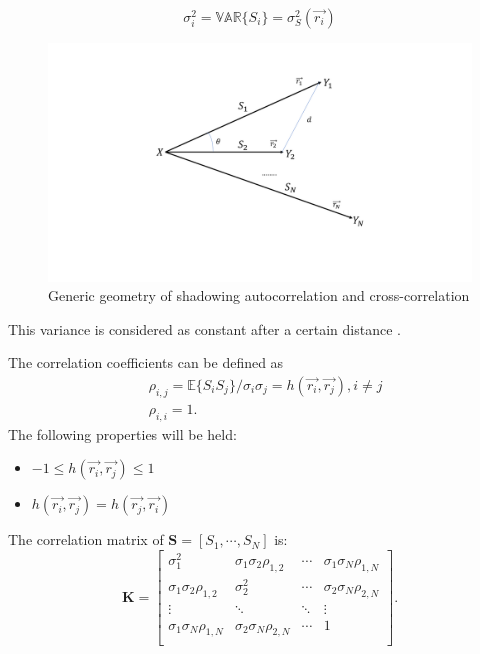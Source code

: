 \begin{equation}
\sigma_{i}^{2} = \mathbb{VAR}\{S_{i}\} = \sigma_{S}^2(\vec{r_{i}})
\label{eq:1}
\end{equation}
\begin{figure} 
\centering
\includegraphics[width=14cm]{FadingGeometry.pdf}
\caption{Generic geometry of shadowing autocorrelation and cross-correlation}
\label{fig:2}
\end{figure}
This variance is considered as constant after a certain distance \cite{kitchener2006correlated}.
\par The correlation coefficients can be defined as
\begin{equation}
\begin{split}
& \rho_{i,j} = \mathbb{E}\{S_{i}S_{j}\}/\sigma_{i}\sigma_{j} = h(\vec{r_{i}}, \vec{r_{j}}), i \neq j \\
& \rho_{i,i} = 1.
\end{split}
\label{eq:2}
\end{equation}
The following properties will be held:
\begin{itemize} 
\item $-1\leq h(\vec{r_{i}}, \vec{r_{j}}) \leq 1$
\item $h(\vec{r_{i}}, \vec{r_{j}})  = h(\vec{r_{j}}, \vec{r_{i}}) $
\end{itemize}
The correlation matrix of $\mathbf{S} = [S_{1}, \cdots, S_{N}]$ is:
\begin{equation}
\mathbf{K} = \left[\begin{array}{cccc}
\sigma_{1}^{2} & \sigma_{1}\sigma_{2}\rho_{1,2} & \cdots & \sigma_{1}\sigma_{N}\rho_{1,N}\\
\sigma_{1}\sigma_{2}\rho_{1,2} & \sigma_{2}^{2} & \cdots & \sigma_{2}\sigma_{N}\rho_{2,N}\\
\vdots & \ddots & \ddots & \vdots\\
\sigma_{1}\sigma_{N}\rho_{1,N} & \sigma_{2}\sigma_{N}\rho_{2,N} & \cdots & 1\\
\end{array}\right].
\label{eq:3}
\end{equation}
